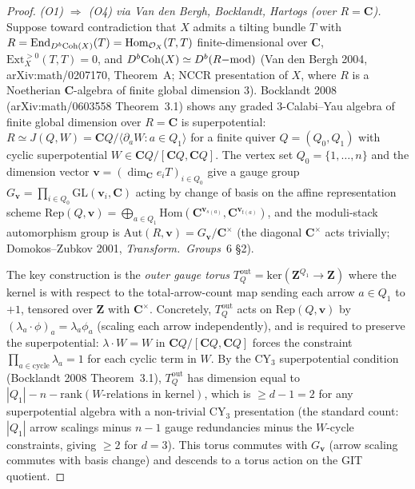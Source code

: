 \begin{proof}
\emph{(O1) $\Rightarrow$ (O4) via Van den Bergh, Bocklandt, Hartogs
(over $R = \mathbf C$).} Suppose toward contradiction that $X$ admits
a tilting bundle $T$ with $R = \mathrm{End}_{D^b\mathrm{Coh}(X)}(T)
= \mathrm{Hom}_{\mathcal O_X}(T, T)$ finite-dimensional over $\mathbf C$,
$\mathrm{Ext}^{>0}_X(T, T) = 0$, and $D^b\mathrm{Coh}(X) \simeq D^b(R\mathrm{-mod})$
(Van den Bergh 2004, arXiv:math/0207170, Theorem~A; NCCR presentation
of $X$, where $R$ is a Noetherian $\mathbf C$-algebra of finite global
dimension $3$). Bocklandt 2008 (arXiv:math/0603558 Theorem~3.1) shows
any graded $3$-Calabi--Yau algebra of finite global dimension over
$R = \mathbf C$ is superpotential: $R \simeq J(Q, W) = \mathbf C Q /
\langle \partial_a W : a \in Q_1 \rangle$ for a finite quiver
$Q = (Q_0, Q_1)$ with cyclic superpotential
$W \in \mathbf C Q / [\mathbf C Q, \mathbf C Q]$. The vertex set
$Q_0 = \{1, \ldots, n\}$ and the dimension vector
$\mathbf v = (\dim_\mathbf C e_i T)_{i \in Q_0}$ give a gauge group
$G_{\mathbf v} = \prod_{i \in Q_0} \mathrm{GL}(\mathbf v_i, \mathbf C)$
acting by change of basis on the affine representation scheme
$\mathrm{Rep}(Q, \mathbf v) = \bigoplus_{a \in Q_1}
\mathrm{Hom}(\mathbf C^{\mathbf v_{s(a)}}, \mathbf C^{\mathbf v_{t(a)}})$,
and the moduli-stack automorphism group is
$\mathrm{Aut}(R, \mathbf v) = G_{\mathbf v}/\mathbf C^\times$ (the
diagonal $\mathbf C^\times$ acts trivially; Domokos--Zubkov 2001,
\emph{Transform.\ Groups}~6 \S 2).

The key construction is the \emph{outer gauge torus}
$T_Q^{\mathrm{out}} = \mathrm{ker}(\mathbf Z^{Q_1} \to \mathbf Z)$
where the kernel is with respect to the total-arrow-count map
sending each arrow $a \in Q_1$ to $+1$, tensored over $\mathbf Z$
with $\mathbf C^\times$. Concretely, $T_Q^{\mathrm{out}}$ acts on
$\mathrm{Rep}(Q, \mathbf v)$ by $(\lambda_a \cdot \phi)_a = \lambda_a
\phi_a$ (scaling each arrow independently), and is required to
preserve the superpotential: $\lambda \cdot W = W$ in
$\mathbf C Q / [\mathbf C Q, \mathbf C Q]$ forces the constraint
$\prod_{a \in \text{cycle}} \lambda_a = 1$ for each cyclic term
in $W$. By the CY$_3$ superpotential condition (Bocklandt 2008
Theorem~3.1), $T_Q^{\mathrm{out}}$ has dimension equal to
$|Q_1| - n - \mathrm{rank}(W\text{-relations in kernel})$, which is
$\geq d - 1 = 2$ for any superpotential algebra with a non-trivial
CY$_3$ presentation (the standard count: $|Q_1|$ arrow scalings
minus $n - 1$ gauge redundancies minus the $W$-cycle constraints,
giving $\geq 2$ for $d = 3$). This torus commutes with $G_\mathbf v$
(arrow scaling commutes with basis change) and descends to a torus
action on the GIT quotient.


\end{proof}
